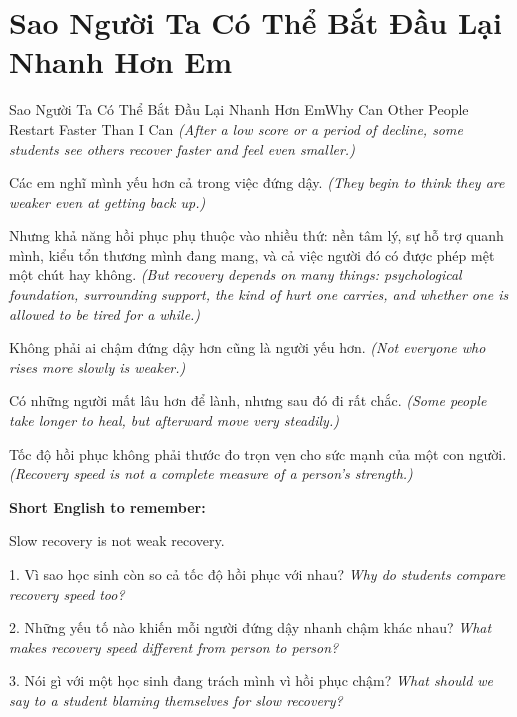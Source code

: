 \section{Sao Người Ta Có Thể Bắt Đầu Lại Nhanh Hơn Em}
\begin{truyen}{Sao Người Ta Có Thể Bắt Đầu Lại Nhanh Hơn Em}{Why Can Other People Restart Faster Than I Can}
\textit{(After a low score or a period of decline, some students see others recover faster and feel even smaller.)}

Các em nghĩ mình yếu hơn cả trong việc đứng dậy.
\textit{(They begin to think they are weaker even at getting back up.)}

Nhưng khả năng hồi phục phụ thuộc vào nhiều thứ: nền tâm lý, sự hỗ trợ quanh mình, kiểu tổn thương mình đang mang, và cả việc người đó có được phép mệt một chút hay không.
\textit{(But recovery depends on many things: psychological foundation, surrounding support, the kind of hurt one carries, and whether one is allowed to be tired for a while.)}

Không phải ai chậm đứng dậy hơn cũng là người yếu hơn.
\textit{(Not everyone who rises more slowly is weaker.)}

Có những người mất lâu hơn để lành, nhưng sau đó đi rất chắc.
\textit{(Some people take longer to heal, but afterward move very steadily.)}
\end{truyen}

\begin{baihoc}
Tốc độ hồi phục không phải thước đo trọn vẹn cho sức mạnh của một con người.
\textit{(Recovery speed is not a complete measure of a person's strength.)}
\end{baihoc}

\begin{ghinhoanh}
\textbf{Short English to remember:}

Slow recovery is not weak recovery.

\end{ghinhoanh}

\begin{tuhocnhanh}
1. Vì sao học sinh còn so cả tốc độ hồi phục với nhau? \textit{Why do students compare recovery speed too?}

2. Những yếu tố nào khiến mỗi người đứng dậy nhanh chậm khác nhau? \textit{What makes recovery speed different from person to person?}

3. Nói gì với một học sinh đang trách mình vì hồi phục chậm? \textit{What should we say to a student blaming themselves for slow recovery?}
\end{tuhocnhanh}
\ngancach
